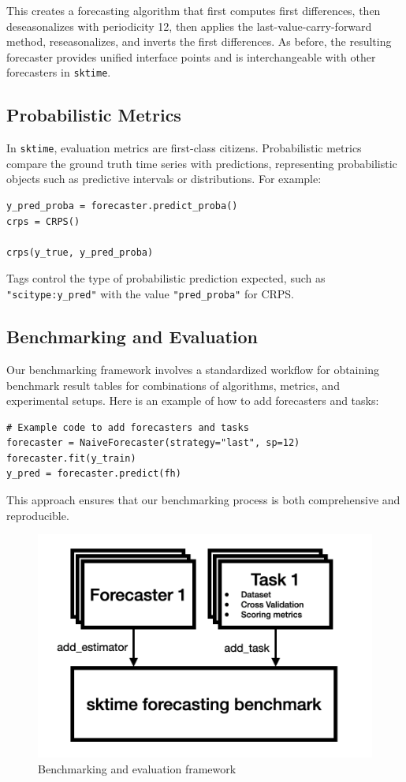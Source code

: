 This creates a forecasting algorithm that first computes first differences, then deseasonalizes with periodicity 12, then applies the last-value-carry-forward method, reseasonalizes, and inverts the first differences.
As before, the resulting forecaster provides unified interface points and is interchangeable with other forecasters in \texttt{sktime}.

\subsection{Probabilistic Metrics}
In \texttt{sktime}, evaluation metrics are first-class citizens. Probabilistic metrics compare the ground truth time series with predictions, representing probabilistic objects such as predictive intervals or distributions. For example:

\begin{verbatim}
y_pred_proba = forecaster.predict_proba()
crps = CRPS()

crps(y_true, y_pred_proba)
\end{verbatim}

Tags control the type of probabilistic prediction expected, such as \texttt{"scitype:y\_pred"} with the value \texttt{"pred\_proba"} for CRPS.

\subsection{Benchmarking and Evaluation}
Our benchmarking framework involves a standardized workflow for obtaining benchmark result tables for combinations of algorithms, metrics, and experimental setups. Here is an example of how to add forecasters and tasks:

\begin{verbatim}
# Example code to add forecasters and tasks
forecaster = NaiveForecaster(strategy="last", sp=12)
forecaster.fit(y_train)
y_pred = forecaster.predict(fh)
\end{verbatim}

This approach ensures that our benchmarking process is both comprehensive and reproducible. 

\begin{figure}
    \centering
    \includegraphics[width=.5\textwidth]{Figures/evaluationFramework.png}
    \caption{Benchmarking and evaluation framework}
    \label{fig:enter-label}
\end{figure}

